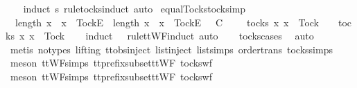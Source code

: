 \begin{isabellebody}
%
\isadelimproof
\ \ %
\endisadelimproof
%
\isatagproof
{}\isamarkupfalse%
\ {\isacharparenleft}induct\ s\ rule{\isacharcolon}tocks{\isachardot}induct{\isacharcomma}\ auto{\isacharparenright}%
\endisatagproof
{\isafoldproof}%
%
\isadelimproof
\isanewline
%
\endisadelimproof
\isanewline
{}\isamarkupfalse%
\ equal{\isacharunderscore}Tocks{\isacharunderscore}tocks{\isacharunderscore}imp{\isacharcolon}\isanewline
\ \ {\isachardoublequoteopen}length\ {\isacharbrackleft}x{\isasymleftarrow}{\isasymrho}\ {\isachardot}\ x\ {\isacharequal}\ {\isacharbrackleft}Tock{\isacharbrackright}\isactrlsub E{\isacharbrackright}\ {\isacharequal}\ length\ {\isacharbrackleft}x{\isasymleftarrow}{\isasymsigma}\ {\isachardot}\ x\ {\isacharequal}\ {\isacharbrackleft}Tock{\isacharbrackright}\isactrlsub E{\isacharbrackright}\ {\isasymLongrightarrow}\ {\isasymrho}\ {\isasymlesssim}\isactrlsub C\ {\isasymsigma}\ {\isasymLongrightarrow}\ {\isasymsigma}\ {\isasymin}\ tocks\ {\isacharbraceleft}x{\isachardot}\ x\ {\isasymnoteq}\ Tock{\isacharbraceright}\ {\isasymLongrightarrow}\ {\isasymrho}\ {\isasymin}\ tocks\ {\isacharbraceleft}x{\isachardot}\ x\ {\isasymnoteq}\ Tock{\isacharbraceright}{\isachardoublequoteclose}\isanewline
%
\isadelimproof
\ \ %
\endisadelimproof
%
\isatagproof
{}\isamarkupfalse%
\ {\isacharparenleft}induct\ {\isasymrho}\ {\isasymsigma}\ rule{\isacharcolon}ttWF{}{\isachardot}induct{\isacharcomma}\ auto{\isacharparenright}\isanewline
\ \ \isamarkupfalse%
\ tocks{\isachardot}cases\ \isamarkupfalse%
\ auto\isanewline
\ \ \isamarkupfalse%
\ {\isacharparenleft}metis\ {\isacharparenleft}no{\isacharunderscore}types{\isacharcomma}\ lifting{\isacharparenright}\ ttobs{\isachardot}inject{\isacharparenleft}{}{\isacharparenright}\ list{\isachardot}inject\ list{\isachardot}simps{\isacharparenleft}{}{\isacharparenright}\ order{\isachardot}trans\ tocks{\isachardot}simps{\isacharparenright}\isanewline
\ \ \isamarkupfalse%
\ {\isacharparenleft}meson\ ttWF{\isachardot}simps{\isacharparenleft}{}{}{\isacharparenright}\ tt{\isacharunderscore}prefix{\isacharunderscore}subset{\isacharunderscore}ttWF\ tocks{\isacharunderscore}wf{\isacharparenright}\isanewline
\ \ \isamarkupfalse%
\ {\isacharparenleft}meson\ ttWF{\isachardot}simps{\isacharparenleft}{}{}{\isacharparenright}\ tt{\isacharunderscore}prefix{\isacharunderscore}subset{\isacharunderscore}ttWF\ tocks{\isacharunderscore}wf{\isacharparenright}\isanewline

\end{isabellebody}
